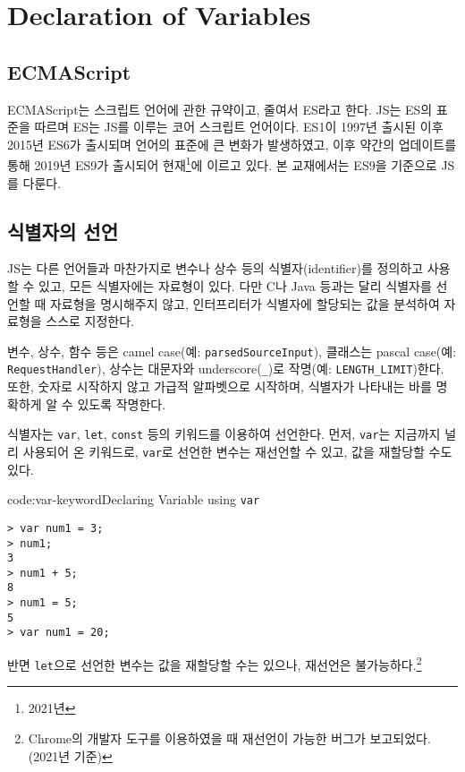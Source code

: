 \section{Declaration of Variables} \label{sect:declaration-of-variables}

\subsection*{ECMAScript}

ECMAScript는 스크립트 언어에 관한 규약이고, 줄여서 ES라고 한다. JS는 ES의 표준을 따르며 ES는 JS를 이루는 코어 스크립트 언어이다. ES1이 1997년 출시된 이후 2015년 ES6가 출시되며 언어의 표준에 큰 변화가 발생하였고, 이후 약간의 업데이트를 통해 2019년 ES9가 출시되어 현재\footnote{2021년}에 이르고 있다. 본 교재에서는 ES9을 기준으로 JS를 다룬다.

\subsection*{식별자의 선언}

JS는 다른 언어들과 마찬가지로 변수나 상수 등의 식별자(identifier)를 정의하고 사용할 수 있고, 모든 식별자에는 자료형이 있다. 다만 C나 Java 등과는 달리 식별자를 선언할 때 자료형을 명시해주지 않고, 인터프리터가 식별자에 할당되는 값을 분석하여 자료형을 스스로 지정한다.

변수, 상수, 함수 등은 camel case(예: \texttt{parsedSourceInput}), 클래스는 pascal case(예: \texttt{RequestHandler}), 상수는 대문자와 underscore(\texttt{\_})로 작명(예: \texttt{LENGTH\_LIMIT})한다. 또한, 숫자로 시작하지 않고 가급적 알파벳으로 시작하며, 식별자가 나타내는 바를 명확하게 알 수 있도록 작명한다. 

식별자는 \texttt{var}, \texttt{let}, \texttt{const} 등의 키워드를 이용하여 선언한다. 먼저, \texttt{var}는 지금까지 널리 사용되어 온 키워드로, \texttt{var}로 선언한 변수는 재선언할 수 있고, 값을 재할당할 수도 있다.

\begin{codeenv}{code:var-keyword}{Declaring Variable using \texttt{var}}\begin{verbatim}
> var num1 = 3;
> num1;
3
> num1 + 5;
8
> num1 = 5;
5
> var num1 = 20;
\end{verbatim}
\end{codeenv}

반면 \texttt{let}으로 선언한 변수는 값을 재할당할 수는 있으나, 재선언은 불가능하다.\footnote{Chrome의 개발자 도구를 이용하였을 때 재선언이 가능한 버그가 보고되었다. (2021년 기준)}


